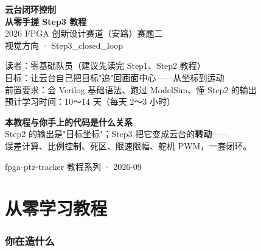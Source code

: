 \documentclass[11pt]{ctexart}
\begin{document}
\begin{titlepage}
\centering
\vspace*{2.2cm}
{\color{deep}\Huge\bfseries 云台闭环控制}\\[6pt]
{\color{deep}\Large\bfseries 从零手搓 Step3 教程}\\[14pt]
{\large 2026 FPGA 创新设计赛道（安路）赛题二}\\[6pt]
{\large 视觉方向 · Step3\_closed\_loop}\\[20pt]

\begin{tcolorbox}[enhanced, colback=codebg, colframe=accent, boxrule=0.8pt,
  arc=2mm, width=12.5cm, left=4mm, right=4mm, top=3mm, bottom=3mm]
\centering
{\small 读者：零基础队员（建议先读完 Step1、Step2 教程）\\
目标：让云台自己把目标"追"回画面中心——从坐标到运动\\
前置要求：会 Verilog 基础语法、跑过 ModelSim、懂 Step2 的输出\\
预计学习时间：10～14 天（每天 2～3 小时）}
\end{tcolorbox}

\vspace{8mm}
\begin{tcolorbox}[enhanced, colback=tipbg, colframe=tipline, boxrule=0.5pt,
  arc=2mm, width=12.5cm, left=4mm, right=4mm, top=2mm, bottom=2mm]
\centering
{\small\color{deep} \textbf{本教程与你手上的代码是什么关系}\\
Step2 的输出是"目标坐标"；Step3 把它变成云台的\textbf{转动}——\\
误差计算、比例控制、死区、限速限幅、舵机 PWM，一套闭环。}
\end{tcolorbox}

\vfill
{\small\color{black!50} fpga-ptz-tracker 教程系列 · 2026-09}
\end{titlepage}

\tableofcontents
\newpage

\part{从零学习教程}

\section{你在造什么}
\end{document}
